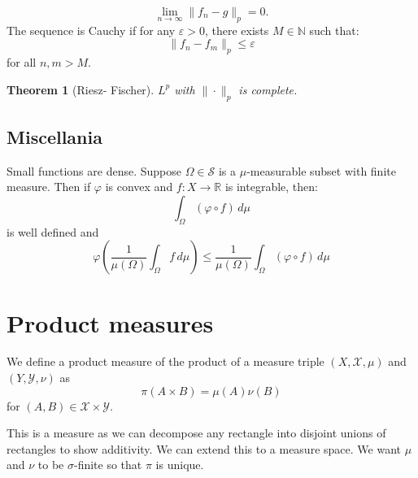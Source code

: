 \documentclass{article}
\newtheorem{theorem}{Theorem}
\theoremstyle{definition}
\numberwithin{theorem}{section}
\numberwithin{equation}{section}
\begin{document}
\begin{equation}
	\lim_{n \rightarrow \infty} \| f_n - g \|_p = 0.
\end{equation}
The sequence is Cauchy if for any $\varepsilon > 0$, there exists $M \in \mathbb{N}$ such that:
\begin{equation}
	\|f_n - f_m \|_{p} \leq \varepsilon
\end{equation}
for all $n, m  > M$. 

\begin{theorem}[Riesz- Fischer]
	$L^p$ with $\| \cdot \|_{p}$ is complete. 
\end{theorem}
\subsection{Miscellania}
Small functions are dense.
Suppose $\Omega \in \mathcal{S}$ is a $\mu$-measurable subset with finite measure. Then if $\varphi$ is convex and $f : X \rightarrow \mathbb{R}$ is integrable, then:
\begin{equation}
	\int_{\Omega} (\varphi \circ f) \, d\mu 
\end{equation}
is well defined
and
\begin{equation}
	\varphi \left(\frac{1}{\mu(\Omega)} \int_{\Omega} f \, d\mu \right)\leq \frac{1}{\mu(\Omega)}\int_{\Omega} (\varphi \circ f) \, d\mu 
\end{equation}

\section{Product measures}
We define a product measure of the product of a measure triple $(X, \mathcal{X}, \mu)$ and $(Y, \mathcal{Y}, \nu)$ as
\begin{equation}
	\pi(A \times B) = \mu(A) \nu(B)
\end{equation}
for $(A, B) \in \mathcal{X} \times \mathcal{Y}$. 

This is a measure as we can decompose any rectangle into disjoint unions of rectangles to show additivity. We can extend this to a measure space. We want $\mu$ and $\nu$ to be $\sigma$-finite so that $\pi$ is unique. 
\end{document}
